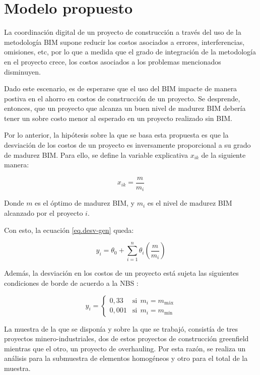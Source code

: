 \section{Modelo propuesto}

La coordinación digital de un proyecto de construcción a través del uso de la metodología BIM supone reducir los costos asociados a errores, interferencias, omisiones, etc, por lo que a medida que el grado de integración de la metodología en el proyecto crece, los costos asociados a los problemas mencionados disminuyen.

Dado este escenario, es de esperarse que el uso del BIM impacte de manera postiva en el ahorro en costos de construcción de un proyecto. Se desprende, entonces, que un proyecto que alcanza un buen nivel de madurez BIM debería tener un sobre costo menor al esperado en un proyecto realizado sin BIM.

Por lo anterior, la hipótesis sobre la que se basa esta propuesta es que la desviación de los costos de un proyecto es inversamente proporcional a su grado de madurez BIM. Para ello, se define la variable explicativa $x_{ik}$ de la siguiente manera:

\begin{equation}
    x_{ik} = \frac{m}{m_i}
\end{equation}

Donde $m$ es el óptimo de madurez BIM, y $m_i$ es el nivel de madurez BIM alcanzado por el proyecto $i$. 

Con esto, la ecuación \eqref{eq.desv-gen} queda:

\begin{equation}
    y_i = \theta_0 + \sum\limits_{i=1}^n \theta_i \left(\frac{m}{m_i} \right)
\end{equation}

Además, la desviación en los costos de un proyecto está sujeta las siguientes condiciones de borde de acuerdo a la NBS \cite{nbs}:

\begin{equation}
    y_i = 
    \begin{cases}
        0,33 & \text{si}~~ m_i = m_{\text{máx}} \\
        0,001 & \text{si}~~ m_i = m_{\text{mín}}
    \end{cases}
\end{equation}

La muestra de la que se disponía y sobre la que se trabajó, consistía de tres proyectos minero-industriales, dos de estos proyectos de construcción greenfield mientras que el otro, un proyecto de overhauling. Por esta razón, se realiza un análisis para la submuestra de elementos homogéneos y otro para el total de la muestra.

